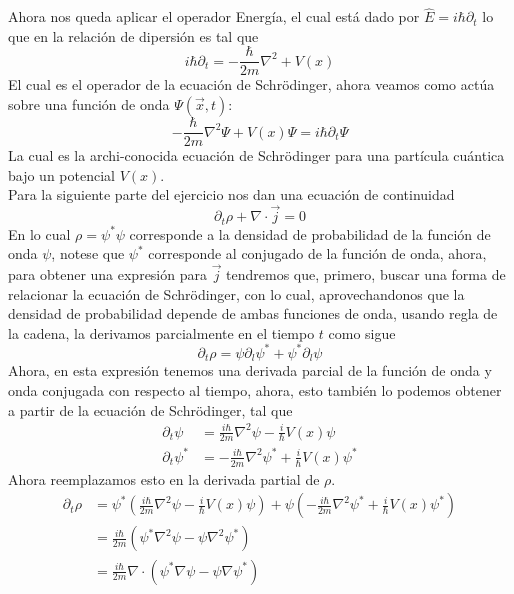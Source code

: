\documentclass[../main_ej.tex]{subfiles}
\begin{document}
Ahora nos queda aplicar el operador Energía, el cual está dado por $\hat{E}=i\hbar\partial_t$ lo que en la relación de dipersión es tal que
\begin{equation*}
  i\hbar \partial_t = -\frac{\hbar}{2m}\nabla^2 + V(x)
\end{equation*}
El cual es el operador de la ecuación de Schrödinger, ahora veamos como actúa sobre una función de onda $\Psi(\vec{x},t)$:
\begin{equation}
  -\frac{\hbar}{2m}\nabla^2\Psi + V(x)\Psi = i\hbar \partial_t\Psi 
\end{equation}
La cual es la archi-conocida ecuación de Schrödinger para una partícula cuántica bajo un potencial $V(x)$. \\
Para la siguiente parte del ejercicio nos dan una ecuación de continuidad 
\begin{equation*}
  \partial_t\rho + \nabla \cdot \vec{j} = 0
\end{equation*}
En lo cual $\rho=\psi^*\psi$ corresponde a la densidad de probabilidad de la función de onda $\psi$, notese que $\psi^*$ corresponde al conjugado de la función de onda, ahora, para obtener una expresión para $\vec{j}$ tendremos que, primero, buscar una forma de relacionar la ecuación de Schrödinger, con lo cual, aprovechandonos que la densidad de probabilidad depende de ambas funciones de onda, usando regla de la cadena, la derivamos parcialmente en el tiempo $t$ como sigue 
\begin{equation*}
  \partial_t\rho = \psi\partial_l\psi^* + \psi^*\partial_l\psi  
\end{equation*}
Ahora, en esta expresión tenemos una derivada parcial de la función de onda y onda conjugada con respecto al tiempo, ahora, esto también lo podemos obtener a partir de la ecuación de Schrödinger, tal que
\begin{align*}
  \partial_t \psi & = \frac{i\hbar}{2m}\nabla^2 \psi -\frac{i}{\hbar}V(x)\psi \\ 
  \partial_t \psi^* & = -\frac{i\hbar}{2m}\nabla^2 \psi^* +\frac{i}{\hbar}V(x)\psi^* 
\end{align*}
Ahora reemplazamos esto en la derivada partial de $\rho$.
\begin{align*}
\partial_t\rho & = \psi^*\left(\frac{i\hbar}{2m}\nabla^2 \psi -\frac{i}{\hbar}V(x)\psi \right) + \psi \left(  -\frac{i\hbar}{2m}\nabla^2 \psi^* +\frac{i}{\hbar}V(x)\psi^* \right) \\
  & = \frac{i\hbar}{2m} \left( \psi^* \nabla^2\psi -\psi \nabla^2\psi^* \right) \\
  & = \frac{i\hbar}{2m}\nabla \cdot \left( \psi^*\nabla \psi - \psi \nabla \psi^* \right)
\end{align*}
\end{document}
